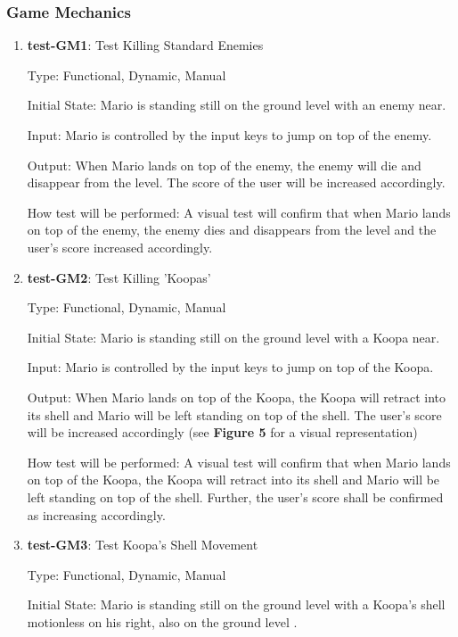 \documentclass[12pt, titlepage]{article}
\begin{document}
\subsubsection{Game Mechanics}

\begin{enumerate}

\item{\textbf{test-GM1}: Test Killing Standard Enemies\\}

Type: Functional, Dynamic, Manual

Initial State: Mario is standing still on the ground level with an enemy near.

Input: Mario is controlled by the input keys to jump on top of the enemy.

Output: When Mario lands on top of the enemy, the enemy will die and disappear from the level. The score of the user will be increased accordingly.

How test will be performed: A visual test will confirm that when Mario lands on top of the enemy, the enemy dies and disappears from the level and the user's score increased accordingly.

\item{\textbf{test-GM2}: Test Killing 'Koopas'\\}

Type: Functional, Dynamic, Manual

Initial State: Mario is standing still on the ground level with a Koopa near.

Input: Mario is controlled by the input keys to jump on top of the Koopa.

Output: When Mario lands on top of the Koopa, the Koopa will retract into its shell and Mario will be left standing on top of the shell. The user's score will be increased accordingly (see \textbf{Figure 5} for a visual representation)

How test will be performed: A visual test will confirm that when Mario lands on top of the Koopa, the Koopa will retract into its shell and Mario will be left standing on top of the shell. Further, the user's score shall be confirmed as increasing accordingly.

\item{\textbf{test-GM3}: Test Koopa's Shell Movement\\}

Type: Functional, Dynamic, Manual

Initial State: Mario is standing still on the ground level with a Koopa's shell motionless on his right, also on the ground level .


\end{enumerate}
\end{document}

